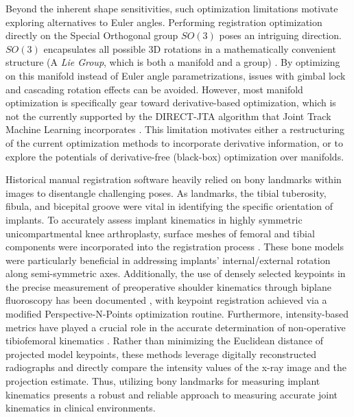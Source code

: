 Beyond the inherent shape sensitivities, such optimization limitations motivate exploring alternatives to Euler angles.
Performing registration optimization directly on the Special Orthogonal group $SO(3)$ poses an intriguing direction.
$SO(3)$ encapsulates all possible 3D rotations in a mathematically convenient structure (A \emph{Lie Group}, which is both a manifold and a group) \cite{zillerLieGroupsRepresentation2010,serreLieAlgebrasLie1992}.
By optimizing on this manifold instead of Euler angle parametrizations, issues with gimbal lock and cascading rotation effects can be avoided.
However, most manifold optimization is specifically gear toward derivative-based optimization, which is not the currently supported by the DIRECT-JTA algorithm that Joint Track Machine Learning incorporates \cite{jensenJointTrackMachine2023,jonesLipschitzianOptimizationLipschitz1993,floodAutomatedRegistration3D2018}.
This limitation motivates either a restructuring of the current optimization methods to incorporate derivative information, or to explore the potentials of derivative-free (black-box) optimization \cite{audetDerivativeFreeBlackboxOptimization2017} over manifolds.


Historical manual registration software heavily relied on bony landmarks within images to disentangle challenging poses.
As landmarks, the tibial tuberosity, fibula, and bicepital groove were vital in identifying the specific orientation of implants.
To accurately assess implant kinematics in highly symmetric unicompartmental knee arthroplasty, surface meshes of femoral and tibial components were incorporated into the registration process \cite{banksComparingVivoKinematics2005}.
These bone models were particularly beneficial in addressing implants' internal/external rotation along semi-symmetric axes.
Additionally, the use of densely selected keypoints in the precise measurement of preoperative shoulder kinematics through biplane fluoroscopy has been documented \cite{burtonFullyAutomaticTracking2023}, with keypoint registration achieved via a modified Perspective-N-Points optimization routine.
Furthermore, intensity-based metrics have played a crucial role in the accurate determination of non-operative tibiofemoral kinematics \cite{bakaStatisticalShapeModelBased2012}.
Rather than minimizing the Euclidean distance of projected model keypoints, these methods leverage digitally reconstructed radiographs and directly compare the intensity values of the x-ray image and the projection estimate.
Thus, utilizing bony landmarks for measuring implant kinematics presents a robust and reliable approach to measuring accurate joint kinematics in clinical environments.



